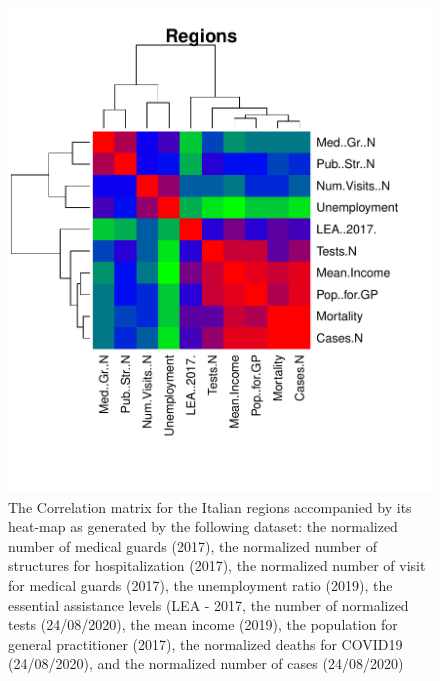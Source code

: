 \documentclass[
12pt, %
a4paper, %
oneside, %
headinclude,footinclude, %
BCOR5mm, %
]{scrartcl}
\begin{document}
\begin{figure}[h]
\begin{center}
\includegraphics[scale=1]{Pic/Regions_CorrMatrix.pdf}
\caption{The Correlation matrix for the Italian regions accompanied by its heat-map as generated by the following dataset: the normalized number of medical guards (2017), the normalized number of structures for hospitalization (2017), the normalized number of visit for medical guards (2017), the unemployment ratio (2019), the essential assistance levels (LEA - 2017, the number of normalized tests (24/08/2020), the mean income (2019), the population for general practitioner  (2017), the normalized deaths for COVID19 (24/08/2020), and the normalized number of cases (24/08/2020) }
\label{Regions_CorrMatrix}
\end{center}
\end{figure}
\end{document}

